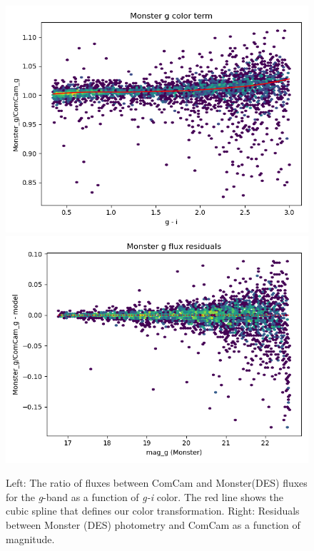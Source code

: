 \begin{figure}
    \includegraphics[width=0.49\linewidth]{./figures/color_terms/Monster_to_ComCam_band_g_color_term.png}
    \includegraphics[width=0.49\linewidth]{./figures/color_terms/Monster_to_ComCam_band_g_flux_residuals.png}
    \caption{Left: The ratio of fluxes between ComCam and Monster(DES) fluxes for the \textit{g}-band as a function of \textit{g-i} color. The red line shows the cubic spline that defines our color transformation.
    Right: Residuals between Monster (DES) photometry and ComCam as a function of magnitude.}
    \label{fig:color-monster-to-comcam-g}
\end{figure}

